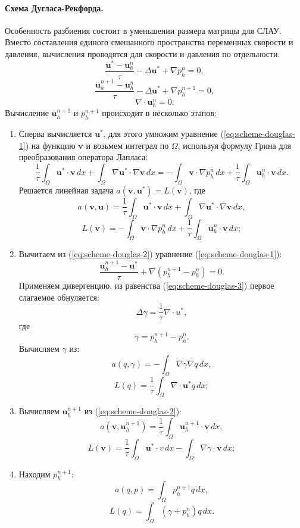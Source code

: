 \documentclass[12pt]{article}
\begin{document}
\paragraph{Схема Дугласа-Рекфорда.} Особенность разбиения состоит в уменьшении размера матрицы для СЛАУ. Вместо составления единого смешанного пространства переменных скорости и давления, вычисления проводятся для скорости и давления по отдельности. 
\begin{equation} \label{eq:scheme-douglas-1}
\frac{{\bm u}^{*}-{\bm u}_h^n}{\tau} - \Delta {\bm u}^{*}+{\nabla}p_h^n=0,
\end{equation}
\begin{equation} \label{eq:scheme-douglas-2}
\frac{{\bm u}_h^{n+1}-{\bm u}_h^n}{\tau} - \Delta {\bm u}^{*}+{\nabla}p_h^{n+1}=0,
\end{equation}
\begin{equation} \label{eq:scheme-douglas-3}
\nabla \cdot {\bm u}_h^n = 0.
\end{equation}
Вычисление ${\bm u}_h^{n+1}$ и $p_h^{n+1}$ происходит в несколько этапов:
\begin{enumerate}
\item 
Сперва вычисляется ${\bm u}^*$, для этого умножим уравнение (\ref{eq:scheme-douglas-1}) на функцию $\bm v$ и возьмем интеграл по $\Omega$, используя формулу Грина для преобразования оператора Лапласа:
$$
\frac{1}{\tau}\int_{\Omega} {\bm u}^*\cdot {\bm v} \,dx + \int_{\Omega} \nabla {\bm u}^* \cdot \nabla {\bm v} \,dx = -\int_{\Omega} {\bm v} \cdot \nabla p_h^{n}\, dx + \frac{1}{\tau} \int_{\Omega} {\bm u}_h^{n} \cdot {\bm v} \,dx.
$$
Решается линейная задача $a({\bm v}, {\bm u}^*) = L({\bm v})$, где
$$
a({\bm v}, {\bm u}) = \frac{1}{\tau}\int_{\Omega} {\bm u}^*\cdot {\bm v} \,dx + \int_{\Omega} \nabla {\bm u}^* \cdot \nabla {\bm v} \,dx,
$$
$$
L({\bm v}) = -\int_{\Omega} {\bm v} \cdot \nabla p_h^{n} \,dx + \frac{1}{\tau} \int_{\Omega} {\bm u}_h^{n} \cdot {\bm v} \,dx;
$$
\item 
Вычитаем из (\ref{eq:scheme-douglas-2}) уравнение (\ref{eq:scheme-douglas-1}):
\begin{equation} \label{eq:scheme-douglas-1}
\frac{{\bm u}_h^{n+1}-{\bm u}^*}{\tau} + {\nabla}(p_h^{n+1} - p_h^n )=0.
\end{equation}
Применяем дивергенцию, из равенства ({\ref{eq:scheme-douglas-3}}) первое слагаемое обнуляется:
$$
\Delta \gamma = \frac{1}{\tau} \nabla \cdot u^{*},
$$
где 
$$
\gamma = p_h^{n+1}-p_h^n.
$$
Вычисляем $\gamma$ из:
$$
a(q, \gamma) = -\int_{\Omega} \nabla \gamma \nabla q \,dx,
$$
$$
L(q) = \frac{1}{\tau} \int_{\Omega} \nabla \cdot {\bm u}^* q \,dx;
$$
\item 
Вычисляем ${\bm u}_h^{n+1}$ из (\ref{eq:scheme-douglas-2}):
$$
a({\bm v}, {\bm u}_h^{n+1}) = \frac{1}{\tau} \int_{\Omega} {\bm u}_h^{n+1} \cdot {\bm v}\,dx,
$$
$$
L({\bm v}) = \frac{1}{\tau} \int_{\Omega} {\bm u}^* \cdot v \,dx - \int_{\Omega} \nabla \gamma \cdot {\bm v} \,dx;
$$
\item 
Находим $p_h^{n+1}$:
$$
a(q, p) = \int_{\Omega} p_h^{n+1} q\,dx,
$$
$$
L(q) = \int_{\Omega} (\gamma + p_h^n) q\,dx.
$$
\end{enumerate}
\end{document}
